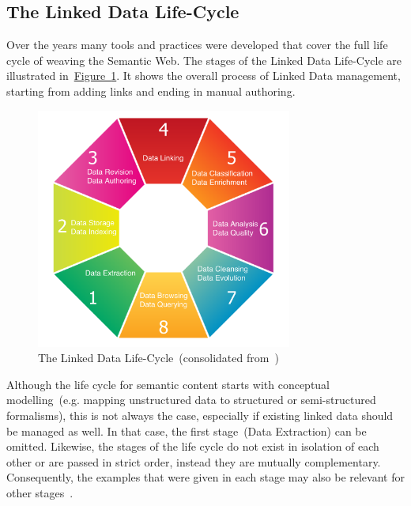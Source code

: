 \subsection{The Linked Data Life-Cycle}\label{sec:ld_lifecycle}
Over the years many tools and practices were developed that cover the full life cycle of weaving the Semantic Web. The stages of the Linked Data Life-Cycle are illustrated in~\hyperref[fig:linked_data_life_cycle]{Figure~\ref*{fig:linked_data_life_cycle}}. It shows the overall process of Linked Data management, starting from adding links and ending in manual authoring. 
\begin{figure}
	 \centering
	 \includegraphics[width=0.75\textwidth]{drawio/Linked_Data_Life_Cycle}
	 \caption{The Linked Data Life-Cycle~(consolidated from~\cite{auer2011, auer2012, siorpaes2008})}\label{fig:linked_data_life_cycle}
\end{figure}  
Although the life cycle for semantic content starts with conceptual modelling~(e.g. mapping unstructured data to structured or semi-structured formalisms), this is not always the case, especially if existing linked data should be managed as well. In that case, the first stage~(Data Extraction) can be omitted. Likewise, the stages of the life cycle do not exist in isolation of each other or are passed in strict order, instead they are mutually complementary. Consequently, the examples that were given in each stage may also be relevant for other stages~\cite{simperl2013}. 

